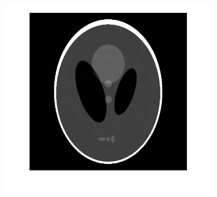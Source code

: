 \documentclass[hyperref]{ctexart}
\begin{document}
{\begin{figure}[htbp]
{				\includegraphics[scale=0.2]{3.png}
			}
			\quad
			\quad
			\subfigure[pic5.]{
}
\end{figure}}
\end{document}
